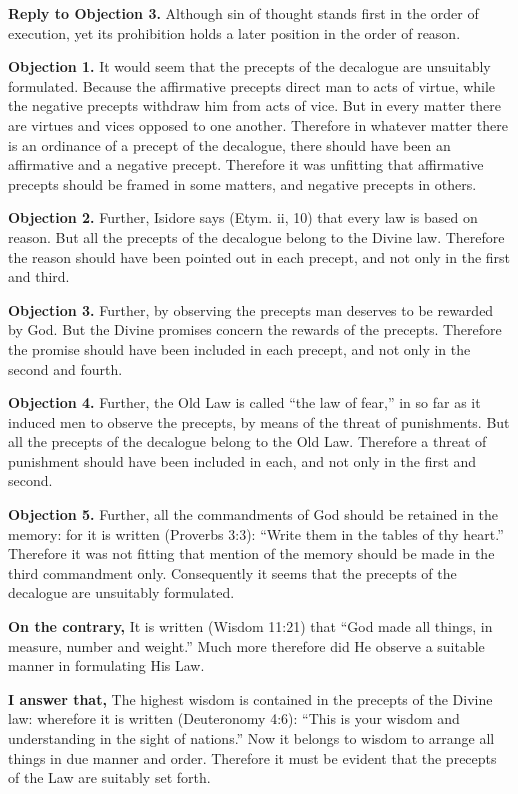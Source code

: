 \textbf{Reply to Objection 3.} Although sin of thought stands first in the order of execution, yet its prohibition holds a later position in the order of reason.


\textbf{Objection 1.} It would seem that the precepts of the decalogue are unsuitably formulated. Because the affirmative precepts direct man to acts of virtue, while the negative precepts withdraw him from acts of vice. But in every matter there are virtues and vices opposed to one another. Therefore in whatever matter there is an ordinance of a precept of the decalogue, there should have been an affirmative and a negative precept. Therefore it was unfitting that affirmative precepts should be framed in some matters, and negative precepts in others.

\textbf{Objection 2.} Further, Isidore says (Etym. ii, 10) that every law is based on reason. But all the precepts of the decalogue belong to the Divine law. Therefore the reason should have been pointed out in each precept, and not only in the first and third.

\textbf{Objection 3.} Further, by observing the precepts man deserves to be rewarded by God. But the Divine promises concern the rewards of the precepts. Therefore the promise should have been included in each precept, and not only in the second and fourth.

\textbf{Objection 4.} Further, the Old Law is called ``the law of fear,'' in so far as it induced men to observe the precepts, by means of the threat of punishments. But all the precepts of the decalogue belong to the Old Law. Therefore a threat of punishment should have been included in each, and not only in the first and second.

\textbf{Objection 5.} Further, all the commandments of God should be retained in the memory: for it is written (Proverbs 3:3): ``Write them in the tables of thy heart.'' Therefore it was not fitting that mention of the memory should be made in the third commandment only. Consequently it seems that the precepts of the decalogue are unsuitably formulated.

\textbf{On the contrary,} It is written (Wisdom 11:21) that ``God made all things, in measure, number and weight.'' Much more therefore did He observe a suitable manner in formulating His Law.

\textbf{I answer that,} The highest wisdom is contained in the precepts of the Divine law: wherefore it is written (Deuteronomy 4:6): ``This is your wisdom and understanding in the sight of nations.'' Now it belongs to wisdom to arrange all things in due manner and order. Therefore it must be evident that the precepts of the Law are suitably set forth.

